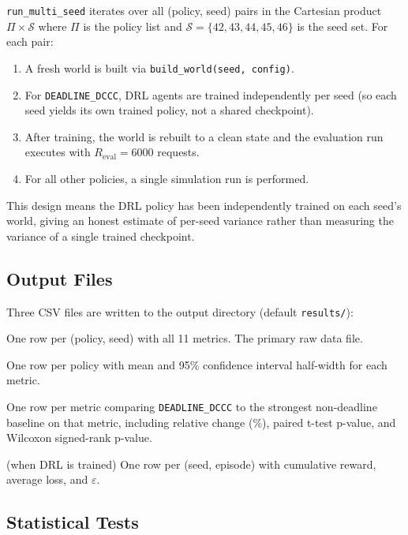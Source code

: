 \documentclass[12pt]{article}
\begin{document}
\texttt{run\_multi\_seed} iterates over all (policy, seed) pairs in the Cartesian product $\Pi \times \mathcal{S}$ where $\Pi$ is the policy list and $\mathcal{S} = \{42, 43, 44, 45, 46\}$ is the seed set. For each pair:

\begin{enumerate}[noitemsep]
  \item A fresh world is built via \texttt{build\_world(seed, config)}.
  \item For \texttt{DEADLINE\_DCCC}, DRL agents are trained independently per seed (so each seed yields its own trained policy, not a shared checkpoint).
  \item After training, the world is rebuilt to a clean state and the evaluation run executes with $R_{\text{eval}} = 6000$ requests.
  \item For all other policies, a single simulation run is performed.
\end{enumerate}

This design means the DRL policy has been independently trained on each seed's world, giving an honest estimate of per-seed variance rather than measuring the variance of a single trained checkpoint.

\subsection{Output Files}

Three CSV files are written to the output directory (default \texttt{results/}):

\begin{description}[noitemsep]
  \item[\texttt{per\_seed.csv}] One row per (policy, seed) with all 11 metrics. The primary raw data file.
  \item[\texttt{summary.csv}] One row per policy with mean and 95\% confidence interval half-width for each metric.
  \item[\texttt{significance.csv}] One row per metric comparing \texttt{DEADLINE\_DCCC} to the strongest non-deadline baseline on that metric, including relative change (\%), paired t-test p-value, and Wilcoxon signed-rank p-value.
  \item[\texttt{drl\_training\_history.csv}] (when DRL is trained) One row per (seed, episode) with cumulative reward, average loss, and $\varepsilon$.
\end{description}

\subsection{Statistical Tests}
\end{document}
